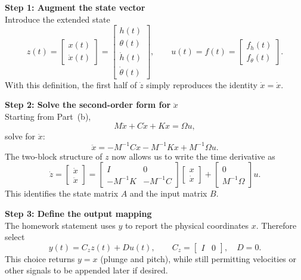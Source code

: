 \documentclass[12pt]{article}
\begin{document}
\begin{stepbox}
\textbf{Step 1: Augment the state vector}\\[0.5em]
Introduce the extended state
\[
z(t) = \begin{bmatrix} x(t) \\ \dot{x}(t) \end{bmatrix}
= \begin{bmatrix} h(t) \\ \theta(t) \\ \dot{h}(t) \\ \dot{\theta}(t) \end{bmatrix},
\qquad
u(t) = f(t) = \begin{bmatrix} f_h(t) \\ f_\theta(t) \end{bmatrix}.
\]
With this definition, the first half of $\dot{z}$ simply reproduces the identity $\dot{x} = \dot{x}$.
\end{stepbox}

\begin{stepbox}
\textbf{Step 2: Solve the second-order form for} $\ddot{x}$\\[0.5em]
Starting from Part~(b),
\[
M\ddot{x} + C\dot{x} + Kx = \Omega u,
\]
solve for $\ddot{x}$:
\[
\ddot{x} = -M^{-1}Cx - M^{-1}Kx + M^{-1}\Omega u.
\]
The two-block structure of $z$ now allows us to write the time derivative as
\[
\dot{z} = \begin{bmatrix}
\dot{x} \\
\ddot{x}
\end{bmatrix}
= \begin{bmatrix}
I & 0 \\
-M^{-1}K & -M^{-1}C
\end{bmatrix}
\begin{bmatrix}
x \\
\dot{x}
\end{bmatrix}
+ \begin{bmatrix}
0 \\
M^{-1}\Omega
\end{bmatrix} u.
\]
This identifies the state matrix $A$ and the input matrix $B$.
\end{stepbox}

\begin{stepbox}
\textbf{Step 3: Define the output mapping}\\[0.5em]
The homework statement uses $y$ to report the physical coordinates $x$.  Therefore select
\[
y(t) = C_z z(t) + D u(t),
\qquad
C_z = \begin{bmatrix} I & 0 \end{bmatrix}, \quad D = 0.
\]
This choice returns $y = x$ (plunge and pitch), while still permitting velocities or other signals to be appended later if desired.
\end{stepbox}
\end{document}
